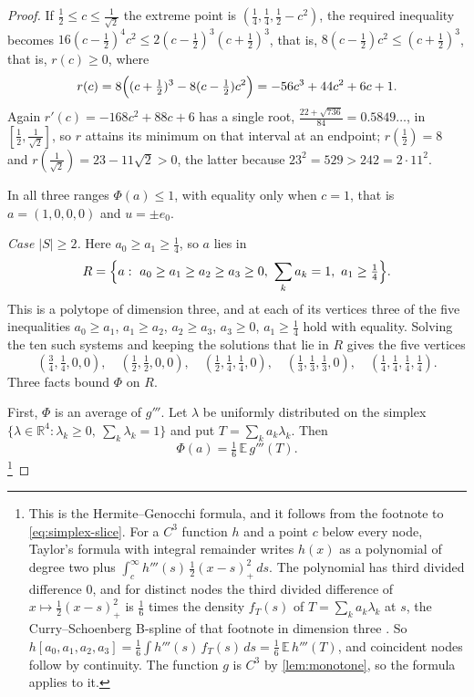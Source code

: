 \documentclass[11pt,reqno]{amsart}
\renewcommand{\_}{\origunderscore\allowbreak}
\numberwithin{equation}{section}
\theoremstyle{plain}
\theoremstyle{definition}
\theoremstyle{remark}
\begin{document}
\begin{proof}
If $\tfrac12\le c\le\tfrac{1}{\sqrt2}$ the extreme point is
$(\tfrac14,\tfrac14,\tfrac12-c^2)$, the required inequality becomes
$16(c-\tfrac12)^4c^2\le2(c-\tfrac12)^3(c+\tfrac12)^3$, that is,
$8(c-\tfrac12)c^2\le(c+\tfrac12)^3$, that is, $r(c)\ge0$, where
\[
  r(c)=8\Bigl((c+\tfrac12)^3-8(c-\tfrac12)c^2\Bigr)=-56c^3+44c^2+6c+1 .
\]
Again $r'(c)=-168c^2+88c+6$ has a single root,
$\tfrac{22+\sqrt{736}}{84}=0.5849\ldots$, in $[\tfrac12,\tfrac1{\sqrt2}]$,
so $r$ attains its minimum on that interval at an endpoint; $r(\tfrac12)=8$
and $r(\tfrac1{\sqrt2})=23-11\sqrt2>0$, the latter because
$23^2=529>242=2\cdot11^2$.

In all three ranges $\Phi(a)\le1$, with equality only when $c=1$, that is
$a=(1,0,0,0)$ and $u=\pm e_0$.

\emph{Case $|S|\ge2$.} Here $a_0\ge a_1\ge\tfrac14$, so $a$ lies in
\[
  R=\Bigl\{a:\ a_0\ge a_1\ge a_2\ge a_3\ge0,\ \sum_ka_k=1,\ a_1\ge\tfrac14\Bigr\}.
\]
This is a polytope of dimension three, and at each of its vertices three of
the five inequalities $a_0\ge a_1$, $a_1\ge a_2$, $a_2\ge a_3$, $a_3\ge0$,
$a_1\ge\frac14$ hold with equality. Solving the ten such systems and keeping
the solutions that lie in $R$ gives the five vertices
\[
  (\tfrac34,\tfrac14,0,0),\quad(\tfrac12,\tfrac12,0,0),\quad
  (\tfrac12,\tfrac14,\tfrac14,0),\quad(\tfrac13,\tfrac13,\tfrac13,0),\quad
  (\tfrac14,\tfrac14,\tfrac14,\tfrac14).
\]
Three facts bound $\Phi$ on $R$.

First, $\Phi$ is an average of $g'''$. Let $\lambda$ be uniformly
distributed on the simplex $\{\lambda\in\mathbb{R}^4:\lambda_k\ge0,\
\sum_k\lambda_k=1\}$ and put $T=\sum_ka_k\lambda_k$. Then
\begin{equation}\label{eq:hermite-genocchi}
  \Phi(a)=\tfrac16\,\mathbb{E}\,g'''(T).
\end{equation}%
\footnote{This is the Hermite--Genocchi formula, and it follows from the
  footnote to \cref{eq:simplex-slice}. For a $C^3$ function $h$ and a point
  $c$ below every node, Taylor's formula with integral remainder writes
  $h(x)$ as a polynomial of degree two plus
  $\int_c^\infty h'''(s)\,\frac12(x-s)_+^2\,ds$. The polynomial has third
  divided difference $0$, and for distinct nodes the third divided
  difference of $x\mapsto\frac12(x-s)_+^2$ is $\frac16$ times the density
  $f_T(s)$ of $T=\sum_ka_k\lambda_k$ at $s$, the Curry--Schoenberg B-spline
  of that footnote in dimension three \cite{CSc66}. So
  $h[a_0,a_1,a_2,a_3]=\frac16\int h'''(s)\,f_T(s)\,ds=\frac16\,\mathbb{E}\,h'''(T)$,
  and coincident nodes follow by continuity. The function $g$ is $C^3$ by
  \cref{lem:monotone}, so the formula applies to it.}


\end{proof}
\end{document}
